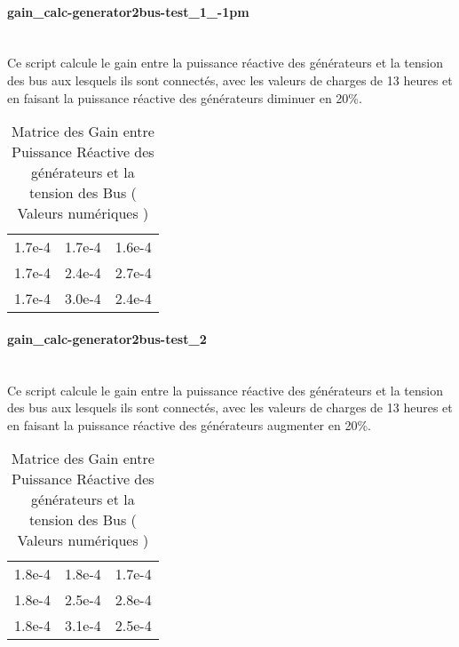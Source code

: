 \paragraph{gain\_calc-generator2bus-test\_1\_-1pm\\\\}
Ce script calcule le gain entre la puissance réactive des générateurs et la tension des bus aux lesquels ils sont connectés, avec les valeurs de charges de 13 heures et en faisant la puissance réactive des générateurs diminuer en 20\%.

\begin{table}[H]
	\captionsetup{justification=centering,margin=2cm}
	\caption{Matrice des Gain entre Puissance Réactive des générateurs et la tension des Bus ( Valeurs numériques )}
	\centering
	\begin{tabular}{ccc}
		1.7e-4&1.7e-4&1.6e-4\\
		1.7e-4&2.4e-4&2.7e-4\\
		1.7e-4&3.0e-4&2.4e-4\\
	\end{tabular}
	
\end{table}
\paragraph{gain\_calc-generator2bus-test\_2\\\\}
Ce script calcule le gain entre la puissance réactive des générateurs et la tension des bus aux lesquels ils sont connectés, avec les valeurs de charges de 13 heures et en faisant la puissance réactive des générateurs augmenter en 20\%.

\begin{table}[H]
	\captionsetup{justification=centering,margin=2cm}
	\caption{Matrice des Gain entre Puissance Réactive des générateurs et la tension des Bus ( Valeurs numériques )}
	\centering
	\begin{tabular}{ccc}
		
		1.8e-4&1.8e-4&1.7e-4\\
		
		1.8e-4&2.5e-4&2.8e-4\\
		
		1.8e-4&3.1e-4&2.5e-4\\
	\end{tabular}
\end{table}


